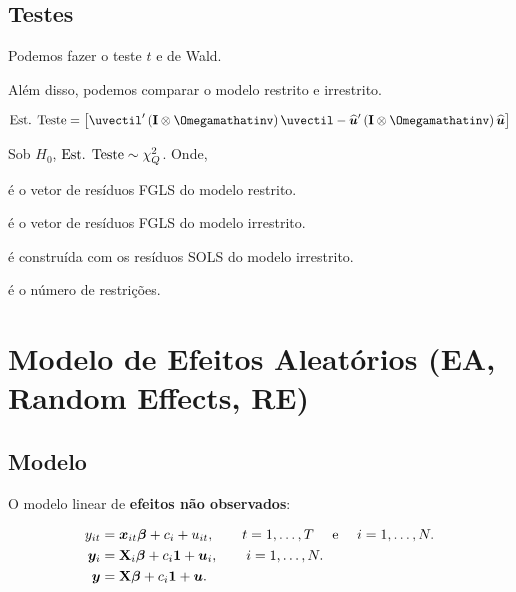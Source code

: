 \documentclass[11pt, oneside, a4paper, article]{article}
\numberwithin{equation}{section}
\begin{document}
\begin{description}
\subsection{Testes}

Podemos fazer o teste $t$ e de Wald.

Além disso, podemos comparar o modelo restrito e irrestrito.

\begin{align*}
\text{Est. Teste} =
\left[ 
\uvectil'\left( \Imat \otimes \Omegamathatinv \right) \uvectil
-
\uvechat' \left( \Imat \otimes \Omegamathatinv \right) \uvechat
\right]
\end{align*}

\noindent
Sob $H_{0}$, 
$\text{Est. Teste} \sim \chi^{2}_{Q}$.
Onde,

\begin{description}[noitemsep]
	\item[$\uvectil$] é o vetor de resíduos FGLS do modelo restrito.
	\item[$\uvechat$] é o vetor de resíduos FGLS do modelo irrestrito.
	\item[$\Omegamathat$] é construída com os resíduos SOLS do modelo irrestrito.
	\item[$Q$] é o número de restrições.
\end{description}

\clearpage
\section{Modelo de Efeitos Aleatórios (EA, Random Effects, RE)}
\noindent
\citet[Sec.10.4 -- Random Effects Methods, p.257]{wool-2010}

\subsection{Modelo}

O modelo linear de \textbf{efeitos não observados}:

\vspace{-1 em}
\begin{align} 
\label{re:mod}
y_{it} &= \boldsymbol{x}_{it}\boldsymbol{\beta} + c_{i} + u_{it},
\qquad t = 1, \dots, T \quad \text{ e } \quad i = 1, \dots, N.
\\
\label{re:mod:vec}
\boldsymbol{y}_{i} &= \mathbf{X}_{i}\boldsymbol{\beta} + c_{i} \boldsymbol{1} + \boldsymbol{u}_{i},
\qquad i = 1, \dots, N.
\\
\label{re:mod:mat}
\boldsymbol{y} &= \mathbf{X}\boldsymbol{\beta} + c_{i} \boldsymbol{1} + \boldsymbol{u}.
\end{align}


\end{description}
\end{document}
